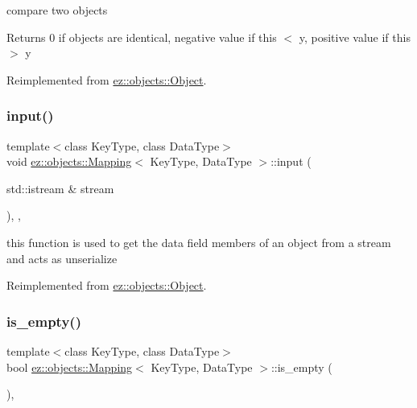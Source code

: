 compare two objects \begin{DoxyReturn}{Returns}
0 if objects are identical, negative value if this $<$ y, positive value if this $>$ y 
\end{DoxyReturn}


Reimplemented from \hyperlink{classez_1_1objects_1_1Object_aca311d389dffa204e425463145f4e1e6}{ez\+::objects\+::\+Object}.

\mbox{\label{classez_1_1objects_1_1Mapping_ad47e98279b853fd10614a24dc201d92e}} 
\subsubsection{\texorpdfstring{input()}{input()}}
{\footnotesize\ttfamily template$<$class Key\+Type, class Data\+Type$>$ \\
void \hyperlink{classez_1_1objects_1_1Mapping}{ez\+::objects\+::\+Mapping}$<$ Key\+Type, Data\+Type $>$\+::input (\begin{DoxyParamCaption}\item[{std\+::istream \&}]{stream }\end{DoxyParamCaption})\hspace{0.3cm}{\ttfamily [inline]}, {\ttfamily [override]}, {\ttfamily [virtual]}}

this function is used to get the data field members of an object from a stream and acts as unserialize 

Reimplemented from \hyperlink{classez_1_1objects_1_1Object_a878bdc53b7f16fda6fa15dab214c4b6a}{ez\+::objects\+::\+Object}.

\mbox{\label{classez_1_1objects_1_1Mapping_a8c7cf83ebf29a35ab146e1a1d0955907}} 
\subsubsection{\texorpdfstring{is\+\_\+empty()}{is\_empty()}}
{\footnotesize\ttfamily template$<$class Key\+Type, class Data\+Type$>$ \\
bool \hyperlink{classez_1_1objects_1_1Mapping}{ez\+::objects\+::\+Mapping}$<$ Key\+Type, Data\+Type $>$\+::is\+\_\+empty (\begin{DoxyParamCaption}{ }\end{DoxyParamCaption})\hspace{0.3cm}{\ttfamily [inline]}, {\ttfamily [virtual]}}

